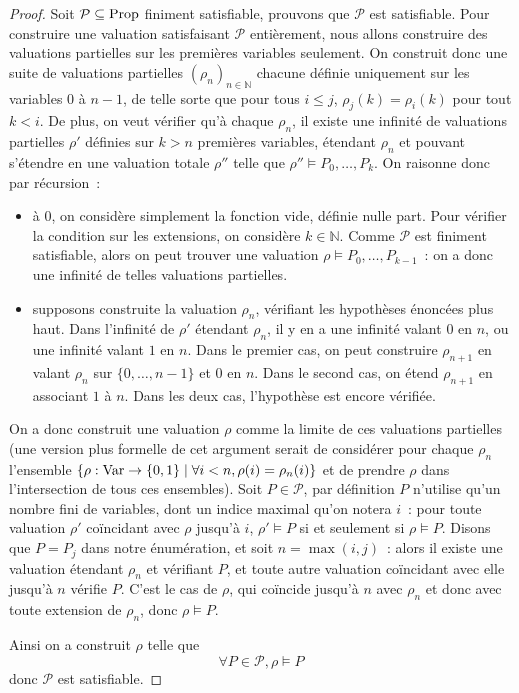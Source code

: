 \begin{proof}
  Soit $\mathcal P\subseteq\operatorname{Prop}$ finiment satisfiable, prouvons que
  $\mathcal P$ est satisfiable. Pour construire une valuation satisfaisant
  $\mathcal P$ entièrement, nous allons construire des valuations partielles
  sur les premières variables seulement. On construit donc une suite de
  valuations partielles $(\rho_n)_{n\in\mathbb N}$ chacune définie uniquement
  sur les variables $0$ à $n-1$, de telle sorte que pour tous $i\leq j$,
  $\rho_j(k) = \rho_i(k)$ pour tout $k < i$. De plus, on veut vérifier qu'à
  chaque $\rho_n$, il existe une infinité de valuations partielles
  $\rho'$ définies sur $k > n$ premières variables, étendant $\rho_n$ et
  pouvant s'étendre en une valuation totale $\rho''$ telle que
  $\rho''\models P_0,\ldots,P_k$. On raisonne donc par récursion~:
  \begin{itemize}
  \item à $0$, on considère simplement la fonction vide, définie nulle part.
    Pour vérifier la condition sur les extensions, on considère $k\in\mathbb N$.
    Comme $\mathcal P$ est finiment satisfiable, alors on peut trouver une
    valuation $\rho\models P_0,\ldots,P_{k-1}$~: on a donc une infinité de
    telles valuations partielles.
  \item supposons construite la valuation $\rho_n$, vérifiant les hypothèses
    énoncées plus haut. Dans l'infinité de $\rho'$ étendant $\rho_n$, il y en a
    une infinité valant $0$ en $n$, ou une infinité valant $1$ en $n$. Dans le
    premier cas, on peut construire $\rho_{n+1}$ en valant $\rho_n$ sur
    $\{0,\ldots,n-1\}$ et $0$ en $n$. Dans le second cas, on étend $\rho_{n+1}$
    en associant $1$ à $n$. Dans les deux cas, l'hypothèse est encore vérifiée.
  \end{itemize}
  On a donc construit une valuation $\rho$ comme la limite de ces valuations
  partielles (une version plus formelle de cet argument serait de considérer
  pour chaque $\rho_n$ l'ensemble
  $\{\rho : \operatorname{Var} \to \{0,1\}\mid \forall i < n, \rho(i) = \rho_n(i)\}$ et de
  prendre $\rho$ dans l'intersection de tous ces ensembles). Soit
  $P\in\mathcal P$, par définition $P$ n'utilise qu'un nombre fini de variables,
  dont un indice maximal qu'on notera $i$~: pour toute valuation $\rho'$
  coïncidant avec $\rho$ jusqu'à $i$, $\rho'\models P$ si et seulement si
  $\rho\models P$. Disons que $P = P_j$ dans notre énumération, et soit
  $n = \max(i,j)$~: alors il existe une valuation étendant $\rho_n$ et
  vérifiant $P$, et toute autre valuation coïncidant avec elle jusqu'à $n$
  vérifie $P$. C'est le cas de $\rho$, qui coïncide jusqu'à $n$ avec $\rho_n$ et
  donc avec toute extension de $\rho_n$, donc $\rho\models P$.

  Ainsi on a construit $\rho$ telle que
  \[\forall P \in\mathcal P, \rho\models P\]
  donc $\mathcal P$ est satisfiable.
\end{proof}


